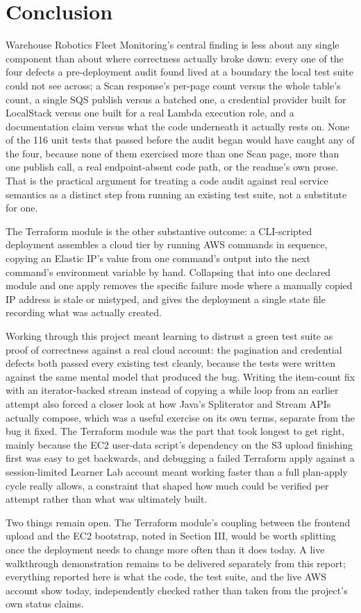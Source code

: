 \documentclass[conference]{IEEEtran}
\begin{document}
\section{Conclusion}

Warehouse Robotics Fleet Monitoring's central finding is less about any single component than about where correctness actually broke down: every one of the four defects a pre-deployment audit found lived at a boundary the local test suite could not see across; a Scan response's per-page count versus the whole table's count, a single SQS publish versus a batched one, a credential provider built for LocalStack versus one built for a real Lambda execution role, and a documentation claim versus what the code underneath it actually rests on. None of the 116 unit tests that passed before the audit began would have caught any of the four, because none of them exercised more than one Scan page, more than one publish call, a real endpoint-absent code path, or the readme's own prose. That is the practical argument for treating a code audit against real service semantics as a distinct step from running an existing test suite, not a substitute for one.

The Terraform module is the other substantive outcome: a CLI-scripted deployment assembles a cloud tier by running AWS commands in sequence, copying an Elastic IP's value from one command's output into the next command's environment variable by hand. Collapsing that into one declared module and one apply removes the specific failure mode where a manually copied IP address is stale or mistyped, and gives the deployment a single state file recording what was actually created.

Working through this project meant learning to distrust a green test suite as proof of correctness against a real cloud account: the pagination and credential defects both passed every existing test cleanly, because the tests were written against the same mental model that produced the bug. Writing the item-count fix with an iterator-backed stream instead of copying a while loop from an earlier attempt also forced a closer look at how Java's Spliterator and Stream APIs actually compose, which was a useful exercise on its own terms, separate from the bug it fixed. The Terraform module was the part that took longest to get right, mainly because the EC2 user-data script's dependency on the S3 upload finishing first was easy to get backwards, and debugging a failed Terraform apply against a session-limited Learner Lab account meant working faster than a full plan-apply cycle really allows, a constraint that shaped how much could be verified per attempt rather than what was ultimately built.

Two things remain open. The Terraform module's coupling between the frontend upload and the EC2 bootstrap, noted in Section III, would be worth splitting once the deployment needs to change more often than it does today. A live walkthrough demonstration remains to be delivered separately from this report; everything reported here is what the code, the test suite, and the live AWS account show today, independently checked rather than taken from the project's own status claims.



\end{document}
